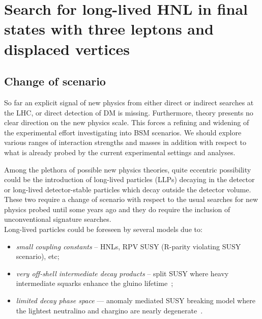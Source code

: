 \chapter{Search for long-lived HNL in final states
with three leptons and displaced vertices} \label{Chapter6} 

\section{Change of scenario}

So far an explicit signal of new physics from either direct or indirect
searches at the LHC, or direct detection of DM is
missing. Furthermore, theory presents no clear direction on the new physics scale.
This forces a refining and widening of the experimental effort
investigating into BSM scenarios. We should explore various ranges of
interaction strengths and masses in addition with respect to
what is already probed by the current experimental
settings and analyses.

Among the plethora of possible new physics theories, quite eccentric
possibility could be the introduction of long-lived particles (LLPs)
decaying in the detector or long-lived detector-stable particles which decay outside the detector volume. 
These two require a change of scenario with respect to the usual
searches for new physics probed until some years ago and they do require the
inclusion of unconventional signature searches.\\
Long-lived particles could be foreseen by several models due to:
\begin{itemize}
\setlength\itemsep{-0.1em}
\item \emph{small coupling constants} -- \ie HNLs, RPV SUSY (R-parity violating
  SUSY scenario), etc;
\item \emph{very off-shell intermediate decay products} -- \ie split SUSY where
heavy intermediate squarks enhance
the gluino lifetime~\cite{ATLAS-CONF-2019-006,2020135114};
\item \emph{limited decay phase space} --- \ie
anomaly mediated SUSY breaking
model where the lightest neutralino
and chargino are nearly degenerate~\cite{Sirunyan:2019wau,Sirunyan:2019gut}.
\end{itemize}

